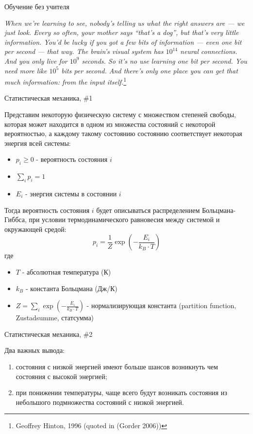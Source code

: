 \documentclass[10pt]{beamer}
\begin{document}
\begin{frame}{Обучение без учителя}

\textit{When we’re learning to see, nobody’s telling us what the right answers are — we just look. Every so often, your mother says “that’s a dog”, but that’s very little information. You’d be lucky if you got a few bits of information — even one bit per second — that way. The brain’s visual system has $10^{14}$ neural connections. And you only live for $10^9$ seconds. So it’s no use learning one bit per second. You need more like $10^5$ bits per second. And there’s only one place you can get that much information: from the input itself.}\footnote{Geoffrey Hinton, 1996 (quoted in (Gorder 2006))}

\end{frame}


\begin{frame}{Статистическая механика, \#1}

Представим некоторую физическую систему с множеством степеней свободы, которая может находится в одном из множества состояний с некоторой вероятностью, а каждому такому состоянию состоянию соответствует некоторая энергия всей системы:
\begin{itemize}
	\item $p_i \geq 0$ - вероятность состояния $i$
	\item $\sum_i p_i = 1$
	\item $E_i$ - энергия системы в состоянии $i$
\end{itemize}
Тогда вероятность состояния $i$ будет описываться распределением Больцмана-Гиббса, при условии термодинамического равновесия между системой и окружающей средой:
\begin{equation}
p_i = \frac{1}{Z} \exp \left( -\frac{E_i}{k_B\cdot T} \right)
\end{equation}
где
\begin{itemize}
	\item $T$ - абсолютная температура (К)
	\item $k_B$ - константа Больцмана (Дж/К)
	\item $Z = \sum_i \exp \left( -\frac{E_i}{k_B\cdot T} \right)$ - нормализирующая константа (partition function, Zustadsumme, статсумма)
\end{itemize}

\end{frame}


\begin{frame}{Статистическая механика, \#2}

Два важных вывода:
\begin{enumerate}
	\item состояния с низкой энергией имеют больше шансов возникнуть чем состояния с высокой энергией;
	\item при понижении температуры, чаще всего будут возникать состояния из небольшого подмножества состояний с низкой энергией.
\end{enumerate}

\end{frame}
\end{document}

